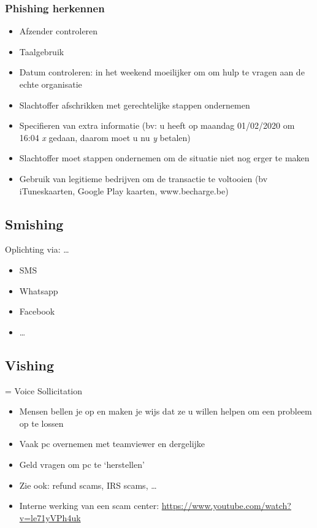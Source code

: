 \documentclass{article}
\begin{document}
\subsubsection{Phishing herkennen}
\begin{itemize}
    \item Afzender controleren
    \item Taalgebruik
    \item Datum controleren: in het weekend moeilijker om om hulp te vragen aan de echte organisatie 
    \item Slachtoffer afschrikken met gerechtelijke stappen ondernemen
    \item Specifieren van extra informatie (bv: u heeft op maandag 01/02/2020 om 16:04 \textit{x} gedaan, daarom moet u nu \textit{y} betalen)
    \item Slachtoffer moet stappen ondernemen om de situatie niet nog erger te maken
    \item Gebruik van legitieme bedrijven om de transactie te voltooien (bv iTuneskaarten, Google Play kaarten, www.becharge.be)
\end{itemize}


\subsection{Smishing}
Oplichting via: \dots
\begin{itemize}
    \item SMS
    \item Whatsapp
    \item Facebook
    \item \dots
\end{itemize}

\subsection{Vishing}
= Voice Sollicitation 

\begin{itemize}
    \item Mensen bellen je op en maken je wijs dat ze u willen helpen om een probleem op te lossen
    \item Vaak pc overnemen met teamviewer en dergelijke
    \item Geld vragen om pc te `herstellen'
    \item Zie ook: refund scams, IRS scams, \dots
    \item Interne werking van een scam center: \url{https://www.youtube.com/watch?v=le71yVPh4uk}
\end{itemize}
\end{document}
